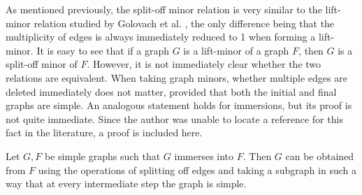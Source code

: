 \documentclass[11pt]{article}
\begin{document}
As mentioned previously, the split-off minor relation is very similar to the lift-minor relation studied by Golovach et al. \cite{GOLOVACH2014286}, the only difference being that the multiplicity of edges is always immediately reduced to 1 when forming a lift-minor. It is easy to see that if a graph $G$ is a lift-minor of a graph $F$, then $G$ is a split-off minor of $F$. However, it is not immediately clear whether the two relations are equivalent.
When taking graph minors, whether multiple edges are deleted immediately does not matter, provided that both the initial and final graphs are simple.
An analogous statement holds for immersions, but its proof is not quite immediate.
Since the author was unable to locate a reference for this fact in the literature, a proof is included here.
\begin{proposition}
    Let $G,F$ be simple graphs such that $G$ immerses into $F$. Then $G$ can be obtained from $F$ using the operations of splitting off edges and taking a subgraph in such a way that at every intermediate step the graph is simple.
\end{proposition}
\end{document}
